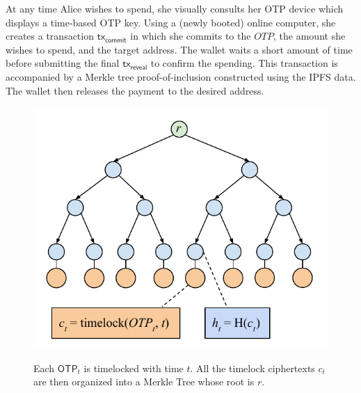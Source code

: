 At any time Alice wishes to spend, she visually consults her OTP device which displays a time-based
OTP key. Using a (newly booted) online computer, she creates a transaction $\textsf{tx}_\textsf{commit}$ in
which she commits to the $OTP$, the amount she wishes to spend, and the target address.
The wallet waits a short amount of time before submitting the final $\textsf{tx}_\textsf{reveal}$
to confirm the spending. This transaction is accompanied by a Merkle tree proof-of-inclusion
constructed using the IPFS data. The wallet then releases the payment to the desired address.

\begin{figure}[H]
    \caption{Each $\textsf{OTP}_t$ is timelocked with time $t$. All the timelock
             ciphertexts $c_t$ are
             then organized into a Merkle Tree whose root is $r$.}
    \centering
    \includegraphics[width=\columnwidth,keepaspectratio]{figures/timelock-merkle.pdf}
    \label{fig.merkle-otp}
\end{figure}

